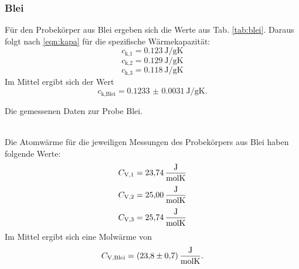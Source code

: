 \subsubsection{Blei}
Für den Probekörper aus Blei ergeben sich die Werte aus Tab. \ref{tab:blei}.
Daraus folgt nach \eqref{eqn:kapa} für die spezifische Wärmekapazität:
\begin{equation*}
    c_\text{k,1} = \SI{0.123}{\joule/\gram\kelvin}
\end{equation*}
\begin{equation*}
    c_\text{k,2} = \SI{0.129}{\joule/\gram\kelvin}
\end{equation*}
\begin{equation*}
    c_\text{k,3} = \SI{0.118}{\joule/\gram\kelvin}
\end{equation*}
Im Mittel ergibt sich der Wert
\begin{equation}
    c_\text{k,Blei} = \SI{0.1233(31)}{\joule/\gram\kelvin}.
\end{equation}
\begin{table}
    \centering
    \caption{Die gemessenen Daten zur Probe Blei. }
    \label{tab:blei}  
\end{table}
\\
Die Atomwärme für die jeweiligen Messungen des Probekörpers aus Blei haben folgende Werte:
\begin{equation*}
    C_\text{V,1} = \SI{23.74}{\frac{\joule}{\mol\kelvin}}
\end{equation*}
\begin{equation*}
    C_\text{V,2} = \SI{25.00}{\frac{\joule}{\mol\kelvin}}
\end{equation*}
\begin{equation*}
    C_\text{V,3} = \SI{25.74}{\frac{\joule}{\mol\kelvin}}
\end{equation*}
Im Mittel ergibt sich eine Molwärme von
\begin{equation}
    C_\text{V,Blei} = \SI{23.8(7)}{\frac{\joule}{\mol\kelvin}} .
\end{equation}

